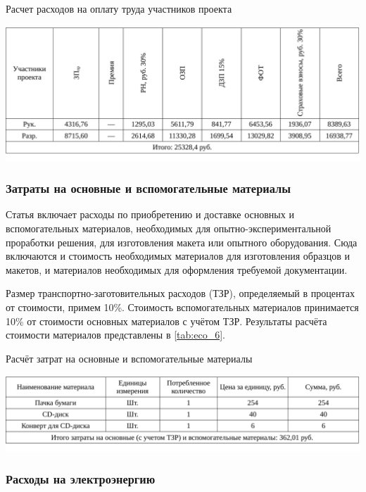 \begin{table}[!ht]
\caption{Расчет расходов на оплату труда участников проекта}
\centering
\includegraphics[page=1, width=1\linewidth]{schedule_5.pdf}
\label{tab:job_is_done_5}
\end{table}


\subsubsection{Затраты на основные и вспомогательные материалы}

Статья включает расходы по приобретению и доставке основных и вспомогательных материалов, необходимых для опытно-экспериментальной проработки решения, для изготовления макета или опытного оборудования. Сюда включаются и стоимость необходимых материалов для изготовления образцов и макетов, и материалов необходимых для оформления требуемой документации.

Размер транспортно-заготовительных расходов (ТЗР), определяемый в процентах от стоимости, примем 10\%. Стоимость вспомогательных материалов принимается 10\% от стоимости основных материалов с учётом ТЗР. Результаты расчёта стоимости материалов представлены в \ref{tab:eco_6}.

\begin{table}[!ht]
\caption{Расчёт затрат на основные и вспомогательные материалы}
\centering
\includegraphics[page=1, width=1\linewidth]{econom.pdf}
\label{tab:eco_6}
\end{table}


\subsubsection{Расходы на электроэнергию}

